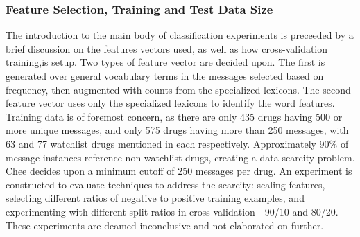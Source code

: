 \documentclass[twoside,11pt]{article}
\begin{document}
\subsubsection{Feature Selection, Training and Test Data Size}
The introduction to the main body of classification experiments is preceeded by a brief discussion on the features vectors used, as well as how cross-validation training,is setup. Two types of feature vector are decided upon. The first is generated over general vocabulary terms in the messages selected based on frequency, then augmented with counts from the specialized lexicons. The second feature vector uses only the specialized lexicons to identify the word features.
Training data is of foremost concern, as there are only 435 drugs having 500 or more unique messages, and only 575 drugs having more than 250 messages, with 63 and 77 watchlist drugs mentioned in each respectively. Approximately 90\% of message instances reference non-watchlist drugs, creating a data scarcity problem. Chee decides upon a minimum cutoff of 250 messages per drug. An experiment is constructed to evaluate techniques to address the scarcity: scaling features, selecting different ratios of negative to positive training examples, and experimenting with different split ratios in cross-validation - 90/10 and 80/20. These experiments are deamed inconclusive and not elaborated on further.
\end{document}
